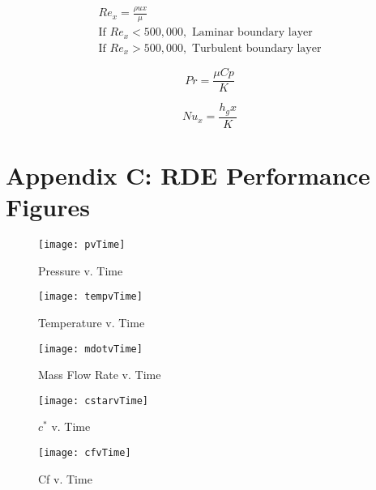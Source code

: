 \begin{equation}
\begin{split}
Re_x=\frac{\rho u x}{\mu}	\\
\text{If } Re_x<500,000, \text{ Laminar boundary layer} \\
\text{If }   Re_x>500,000, \text{ Turbulent boundary layer}
\end{split}
\label{eqn:reynolds}
\end{equation}


\begin{equation}
Pr=\frac{\mu Cp}{K}
\label{eqn:prandtl}
\end{equation}

\begin{equation}
Nu_x=\frac{h_g x}{K}
\label{eqn:nusselt}
\end{equation}

\newpage
\section{Appendix C: RDE Performance Figures}

\begin{figure}[H]
\begin{center}
\texttt{[image: pvTime]}
\caption{Pressure v. Time}
\label{fig:pvTime}
\end{center}
\end{figure}

\begin{figure}[H]
\begin{center}
\texttt{[image: tempvTime]}
\caption{Temperature v. Time}
\label{fig:tempvTime}
\end{center}
\end{figure}

\begin{figure}[H]
\begin{center}
\texttt{[image: mdotvTime]}
\caption{Mass Flow Rate v. Time}
\label{fig:mdotvTime}
\end{center}
\end{figure}

\begin{figure}[H]
\begin{center}
\texttt{[image: cstarvTime]}
\caption{$c^*$ v. Time}
\label{fig:cstarvTime}
\end{center}
\end{figure}

\begin{figure}[H]
\begin{center}
\texttt{[image: cfvTime]}
\caption{Cf v. Time}
\label{fig:cfvTime}
\end{center}
\end{figure}

